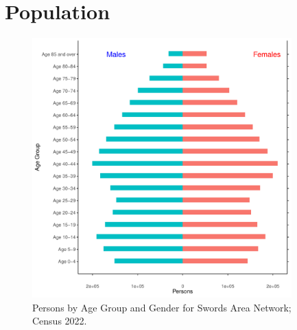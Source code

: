 \documentclass{article}
\begin{document}
\pagebreak

\section{Population} 
\label{sect:Pop}

\begin{figure}[h]
	\centering
	\includegraphics[width = 100mm]{../figures/PyramidPlot.pdf}
	\caption{Persons by Age Group and Gender for Swords Area Network; Census 2022.}
	\label{fig:2ae19629-1a6a-13a3-e055-000000000001}
	\end{figure}
\end{document}
